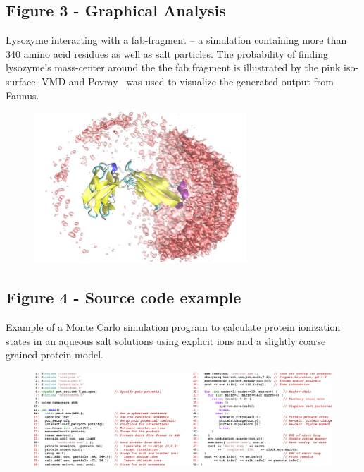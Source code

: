\documentclass[10pt]{bmc_article}
\newenvironment{bmcformat}{\begin{raggedright}\baselineskip20pt\sloppy\setboolean{publ}{false}}{\end{raggedright}\baselineskip20pt\sloppy}
\begin{document}
\begin{bmcformat}
  \subsection*{Figure 3 - Graphical Analysis}
     Lysozyme interacting with a fab-fragment -- a simulation containing
     more than 340 amino acid residues as well as salt particles.
     The probability of finding lysozyme's mass-center around
     the the fab fragment is illustrated by the pink iso-surface.
     VMD and Povray~\cite{povray} was used to visualize the generated output from Faunus.
     \begin{figure}[ht]\center
           \label{fig:snapshot}
      \includegraphics[width=8cm]{pics/snapshot}
      \end{figure}

  \subsection*{Figure 4 - Source code example}
      Example of a Monte Carlo simulation program to calculate protein
      ionization states in an aqueous salt solutions using explicit ions and
      a slightly coarse grained protein model.
      \begin{figure}[ht]\center
      \includegraphics[width=16.5cm]{pics/source}
      \end{figure}
      

\end{bmcformat}
\end{document}
